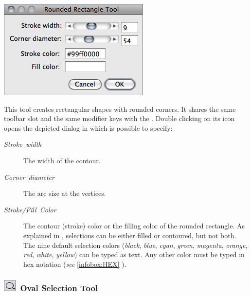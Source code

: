 \noindent %
\begin{minipage}[c][1\totalheight][t]{0.41\columnwidth}%
\includegraphics[scale=0.55]{images/RoundRectangle}%
\end{minipage}%
\begin{minipage}[c][1\totalheight][t]{0.59\columnwidth}%
This tool creates rectangular shapes with rounded corners. It shares
the same toolbar slot and the same modifier keys with the .
Double clicking on its icon opens the depicted dialog in which is
possible to specify:
\begin{description}
\item [{\emph{Stroke\ width}}] The width of the contour.
\item [{\emph{Corner\ diameter}}] The arc size at the vertices.\end{description}
%
\end{minipage}
\begin{description}
\item [{\emph{Stroke/Fill\ Color}}] The contour (stroke) color or the
filling color of the rounded rectangle. As explained in ,
selections can be either filled or contoured, but not both. The nine
default selection colors (\emph{black}, \emph{blue}, \emph{cyan},
\emph{green}, \emph{magenta}, \emph{orange}, \emph{red}, \emph{white},
\emph{yellow}) can be typed as text. Any other color must be typed
in hex notation (\emph{see} \ref{infobox:HEX} ). 
\end{description}



\subsubsection[Oval Selection Tool]{\noindent \textsf{\protect\includegraphics[bb=0bp 5bp 20bp 20bp,scale=0.6]{images/tools/Oval}}~Oval
Selection Tool\label{sub:Oval-Selection-Tool}}

